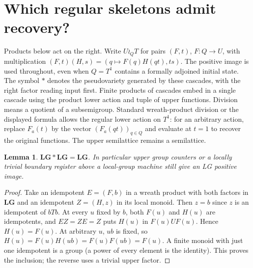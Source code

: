 \documentclass[11pt]{article}
\newtheorem{rdlemma}{Lemma}
\newcommand{\rdLG}{\mathbf{LG}}
\begin{document}
\section*{Which regular skeletons admit recovery?}
Products below act on the right. Write $U\wr_Q T$ for pairs $(F,t)$,
$F:Q\to U$, with multiplication
$(F,t)(H,s)=(q\mapsto F(q)H(qt),ts)$.
The positive image is used throughout, even when $Q=T^1$ contains a
formally adjoined initial state. The symbol $*$ denotes the pseudovariety
generated by these cascades, with the right factor reading input first.
Finite products of cascades embed in a single cascade using the product
lower action and tuple of upper functions. Division means a quotient of a
subsemigroup. Standard wreath-product division or the displayed formula
allows the regular lower action on $T^1$: for an arbitrary action, replace
$F_a(t)$ by the vector $(F_a(qt))_{q\in Q}$ and evaluate at $t=1$ to
recover the original functions. The upper semilattice remains a semilattice.

\begin{rdlemma}
$\rdLG*\rdLG=\rdLG$. In particular upper group counters or a locally trivial
boundary register above a local-group machine still give an LG positive image.
\end{rdlemma}
\begin{proof}
Take an idempotent $E=(F,b)$ in a wreath product with both factors in $\rdLG$
and an idempotent $Z=(H,z)$ in its local monoid. Then $z=b$ since
$z$ is an idempotent of $bTb$. At every $u$ fixed by $b$, both $F(u)$
and $H(u)$ are idempotents, and $EZ=ZE=Z$ puts $H(u)$ in
$F(u)UF(u)$. Hence $H(u)=F(u)$. At arbitrary $u$, $ub$ is fixed, so
$H(u)=F(u)H(ub)=F(u)F(ub)=F(u)$. A finite monoid with just one idempotent
is a group (a power of every element is the identity).
This proves the inclusion; the reverse uses a trivial upper factor.
\end{proof}
\end{document}
